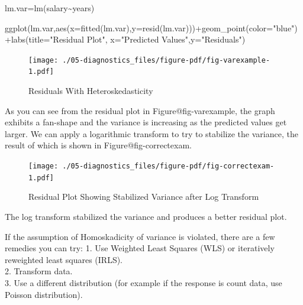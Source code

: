 \documentclass[
  letterpaper,
  DIV=11,
  numbers=noendperiod]{scrreprt}
\newenvironment{Shaded}{\begin{snugshade}}{\end{snugshade}}
\newcommand{\AttributeTok}[1]{\textcolor[rgb]{0.40,0.45,0.13}{#1}}
\newcommand{\FunctionTok}[1]{\textcolor[rgb]{0.28,0.35,0.67}{#1}}
\newcommand{\NormalTok}[1]{\textcolor[rgb]{0.00,0.23,0.31}{#1}}
\newcommand{\OtherTok}[1]{\textcolor[rgb]{0.00,0.23,0.31}{#1}}
\newcommand{\SpecialCharTok}[1]{\textcolor[rgb]{0.37,0.37,0.37}{#1}}
\newcommand{\StringTok}[1]{\textcolor[rgb]{0.13,0.47,0.30}{#1}}
\begin{document}
\begin{Shaded}
\begin{Highlighting}[]
\NormalTok{lm.var}\OtherTok{=}\FunctionTok{lm}\NormalTok{(salary}\SpecialCharTok{\textasciitilde{}}\NormalTok{years)}

\FunctionTok{ggplot}\NormalTok{(lm.var,}\FunctionTok{aes}\NormalTok{(}\AttributeTok{x=}\FunctionTok{fitted}\NormalTok{(lm.var),}\AttributeTok{y=}\FunctionTok{resid}\NormalTok{(lm.var)))}\SpecialCharTok{+}\FunctionTok{geom\_point}\NormalTok{(}\AttributeTok{color=}\StringTok{"blue"}\NormalTok{)}\SpecialCharTok{+}\FunctionTok{labs}\NormalTok{(}\AttributeTok{title=}\StringTok{"Residual Plot"}\NormalTok{, }\AttributeTok{x=}\StringTok{"Predicted Values"}\NormalTok{,}\AttributeTok{y=}\StringTok{"Residuals"}\NormalTok{)}
\end{Highlighting}
\end{Shaded}

\begin{figure}[H]

{\centering \texttt{[image: ./05-diagnostics\_files/figure-pdf/fig-varexample-1.pdf]}

}

\caption{\label{fig-varexample}Residuals With Heteroskedasticity}

\end{figure}

As you can see from the residual plot in Figure@fig-varexample, the
graph exhibits a fan-shape and the variance is increasing as the
predicted values get larger. We can apply a logarithmic transform to try
to stabilize the variance, the result of which is shown in
Figure@fig-correctexam.

\begin{figure}

{\centering \texttt{[image: ./05-diagnostics\_files/figure-pdf/fig-correctexam-1.pdf]}

}

\caption{\label{fig-correctexam}Residual Plot Showing Stabilized
Variance after Log Transform}

\end{figure}

The log transform stabilized the variance and produces a better residual
plot.

If the assumption of Homoskadicity of variance is violated, there are a
few remedies you can try: 1. Use Weighted Least Squares (WLS) or
iteratively reweighted least squares (IRLS).\\
2. Transform data.\\
3. Use a different distribution (for example if the response is count
data, use Poisson distribution).\\
\end{document}
